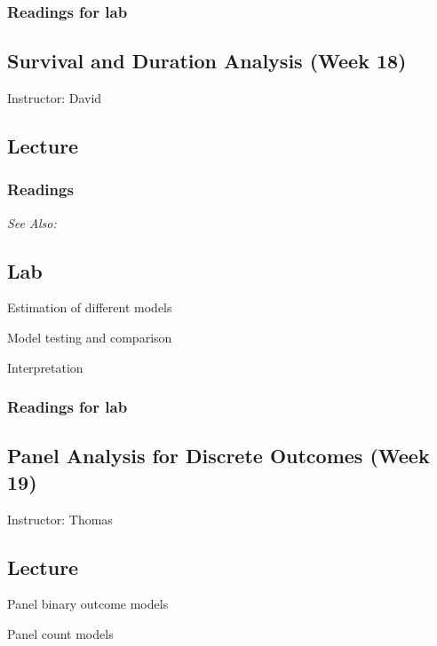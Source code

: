 \documentclass[11pt,a4paper]{article}
\newcommand{\thomas}{\vspace{1em}\noindent Instructor: Thomas\vspace{1em}\\}
\newcommand{\david}{\vspace{1em}\noindent Instructor: David\vspace{1em}\\}
\newcommand{\seealso}{\noindent \emph{See Also:}\\}
\begin{document}
\subsubsection*{Readings for lab}



\clearpage
\subsection{Survival and Duration Analysis (Week 18)}
\emph{}

\david

\subsection*{Lecture}
\begin{itemize*}
\item %
\end{itemize*}

\subsubsection*{Readings}

\seealso


\subsection*{Lab}

\begin{itemize*}
\item Estimation of different models
\item Model testing and comparison
\item Interpretation
\end{itemize*}

\subsubsection*{Readings for lab}



\clearpage
\subsection{Panel Analysis for Discrete Outcomes (Week 19)}
\emph{}

\thomas


\subsection*{Lecture}
\begin{itemize*}
\item Panel binary outcome models
\item Panel count models
\end{itemize*}
\end{document}
